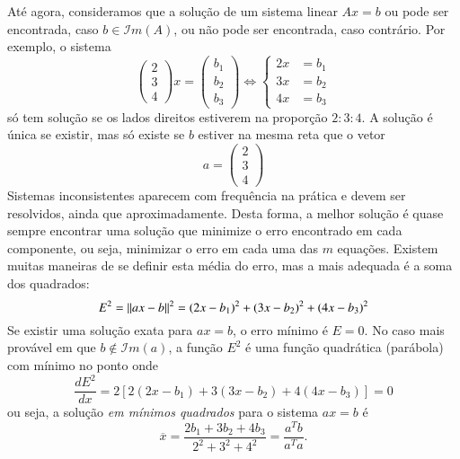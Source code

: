 Até agora, consideramos que a solução de um sistema linear $Ax=b$ ou pode ser encontrada, caso $b\in {\mathcal{I}}m(A)$, ou não pode ser encontrada, caso contrário. Por exemplo, o sistema
\begin{equation*}
	\begin{pmatrix} 2\\ 3\\ 4 \end{pmatrix} x = \begin{pmatrix} b_1\\ b_2\\ b_3\end{pmatrix}
	\Leftrightarrow
	\begin{cases}
     2x &= b_1\\
     3x &= b_2\\
     4x &= b_3
   \end{cases}
\end{equation*}
só tem solução se os lados direitos estiverem na proporção $2:3:4$. A solução é única se existir, mas só existe se $b$ estiver na mesma reta que o vetor
\begin{equation*}
   a = \begin{pmatrix} 2\\ 3\\ 4\end{pmatrix}
\end{equation*}
Sistemas inconsistentes aparecem com frequência na prática e devem ser resolvidos, ainda que aproximadamente. Desta forma, a melhor solução é quase sempre encontrar uma solução que minimize o erro encontrado em cada componente, ou seja, minimizar o erro em cada uma das $m$ equações. Existem muitas maneiras de se definir esta média do erro, mas a mais adequada é a soma dos quadrados:
\begin{equation*}
   E^2 = \| ax-b \|^2 = (2x-b_1)^2+(3x-b_2)^2+(4x-b_3)^2
 \end{equation*}
Se existir uma solução exata para $ax=b$, o erro mínimo é $E=0$. No caso mais provável em que $b\not \in {\mathcal{I}}m(a)$, a função $E^2$ é uma função quadrática (parábola) com mínimo no ponto onde
\begin{equation*}
   \frac{dE^2}{dx} = 2[2(2x-b_1)+3(3x-b_2)+4(4x-b_3)]=0
\end{equation*}
ou seja, a solução \emph{em mínimos quadrados} para o sistema $ax=b$ é
\begin{equation*}
   \overline{x} = \frac{2b_1+3b_2+4b_3}{2^2+3^2+4^2} = \frac{a^Tb}{a^Ta}.
\end{equation*}
